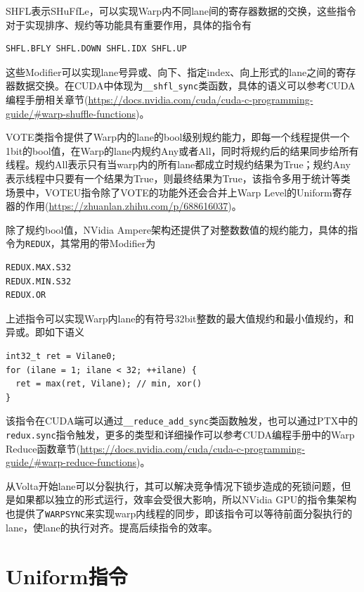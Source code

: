 SHFL表示SHuFfLe，可以实现Warp内不同lane间的寄存器数据的交换，这些指令对于实现排序、规约等功能具有重要作用，具体的指令有

\begin{lstlisting}
SHFL.BFLY SHFL.DOWN SHFL.IDX SHFL.UP
\end{lstlisting}

这些Modifier可以实现lane号异或、向下、指定index、向上形式的lane之间的寄存器数据交换。在CUDA中体现为\lstinline|__shfl_sync|类函数，具体的语义可以参考CUDA编程手册相关章节(\url{https://docs.nvidia.com/cuda/cuda-c-programming-guide/#warp-shuffle-functions})。

VOTE类指令提供了Warp内的lane的bool级别规约能力，即每一个线程提供一个1bit的bool值，在Warp的lane内规约Any或者All，同时将规约后的结果同步给所有线程。规约All表示只有当warp内的所有lane都成立时规约结果为True；规约Any表示线程中只要有一个结果为True，则最终结果为True，该指令多用于统计等类场景中，VOTEU指令除了VOTE的功能外还会合并上Warp Level的Uniform寄存器的作用(\url{https://zhuanlan.zhihu.com/p/688616037})。

除了规约bool值，NVidia Ampere架构还提供了对整数数值的规约能力，具体的指令为\lstinline|REDUX|，其常用的带Modifier为

\begin{lstlisting}
REDUX.MAX.S32
REDUX.MIN.S32
REDUX.OR
\end{lstlisting}

上述指令可以实现Warp内lane的有符号32bit整数的最大值规约和最小值规约，和异或。即如下语义

\begin{lstlisting}
int32_t ret = Vilane0;
for (ilane = 1; ilane < 32; ++ilane) {
  ret = max(ret, Vilane); // min, xor()
}
\end{lstlisting}

该指令在CUDA端可以通过\lstinline|__reduce_add_sync|类函数触发，也可以通过PTX中的\lstinline|redux.sync|指令触发，更多的类型和详细操作可以参考CUDA编程手册中的Warp Reduce函数章节(\url{https://docs.nvidia.com/cuda/cuda-c-programming-guide/#warp-reduce-functions})。

从Volta开始lane可以分裂执行，其可以解决竞争情况下锁步造成的死锁问题，但是如果都以独立的形式运行，效率会受很大影响，所以NVidia GPU的指令集架构也提供了\lstinline|WARPSYNC|来实现warp内线程的同步，即该指令可以等待前面分裂执行的lane，使lane的执行对齐。提高后续指令的效率。

\section{Uniform指令}

